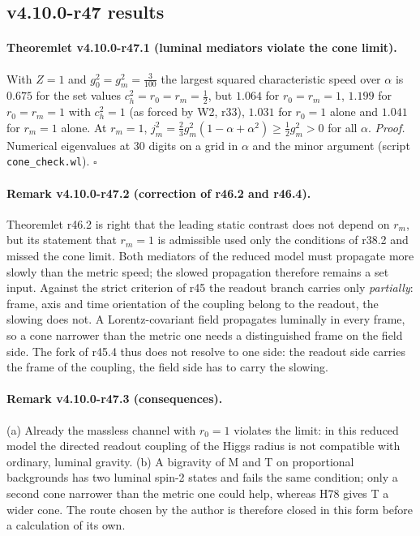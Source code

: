 \subsection*{v4.10.0-r47 results}
\label{subsec:v4100-r47-results}

\paragraph{Theoremlet v4.10.0-r47.1 (luminal mediators violate the cone limit).}
With \(Z=1\) and \(g_0^2=g_m^2=\tfrac3{100}\) the largest squared characteristic speed over \(\alpha\) is \(0.675\) for the set values \(c_h^2=r_0=r_m=\tfrac12\), but \(1.064\) for
\(r_0=r_m=1\), \(1.199\) for \(r_0=r_m=1\) with \(c_h^2=1\) (as forced by W2, r33), \(1.031\) for \(r_0=1\) alone and \(1.041\) for \(r_m=1\) alone.  At \(r_m=1\),
\(j_m^2=\tfrac23g_m^2(1-\alpha+\alpha^2)\ge\tfrac12g_m^2>0\) for all \(\alpha\).
\emph{Proof.} Numerical eigenvalues at 30 digits on a grid in \(\alpha\) and the minor argument (script \texttt{cone\_\allowbreak check.wl}).  \(\square\)

\paragraph{Remark v4.10.0-r47.2 (correction of r46.2 and r46.4).}
Theoremlet r46.2 is right that the leading static contrast does not depend on \(r_m\), but its statement that \(r_m=1\) is admissible used only the conditions of
r38.2 and missed the cone limit.  Both mediators of the reduced model must propagate more slowly than the metric speed; the slowed propagation
therefore remains a set input.  Against the strict criterion of r45 the readout branch carries only \emph{partially}: frame, axis and time
orientation of the coupling belong to the readout, the slowing does not.  A Lorentz-covariant field propagates luminally in every frame, so a cone
narrower than the metric one needs a distinguished frame on the field side.  The fork of r45.4 thus does not resolve to one side: the readout side
carries the frame of the coupling, the field side has to carry the slowing.

\paragraph{Remark v4.10.0-r47.3 (consequences).}
(a) Already the massless channel with \(r_0=1\) violates the limit: in this reduced model the directed readout coupling of the Higgs radius is not
compatible with ordinary, luminal gravity.  (b) A bigravity of M and T on proportional backgrounds has two luminal spin-2 states and fails the
same condition; only a second cone narrower than the metric one could help, whereas H78 gives T a wider cone.  The route chosen by the author is
therefore closed in this form before a calculation of its own.

